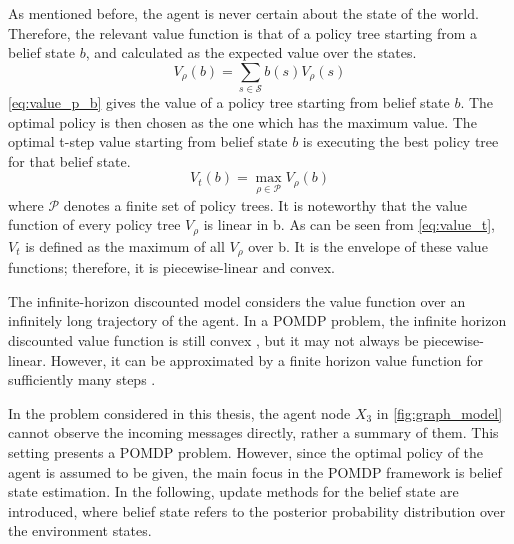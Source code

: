 As mentioned before, the agent is never certain about the state of the world. Therefore, the relevant value function is that of a policy tree starting from a belief state $ b $, and  calculated as the expected value over the states.
\begin{equation}
V_{\rho}(b)=\sum_{s \in \mathcal{S}} b(s) V_{\rho}(s)
\label{eq:value_p_b}
\end{equation}
\autoref{eq:value_p_b} gives the value of a policy tree starting from belief state $ b $. The optimal policy is then chosen as the one which has the maximum value. The optimal t-step value starting from belief state $ b $ is executing the best policy tree for that belief state.
\begin{equation}
V_{t}(b)=\max _{\rho \in \mathcal{P}} V_\rho(b)
\label{eq:value_t}
\end{equation}
where $ \mathcal{P} $ denotes a finite set of policy trees.
It is noteworthy that the value function of every policy tree $ V_\rho $ is linear in b. As can be seen from \autoref{eq:value_t}, $ V_t $ is defined as the maximum of all $ V_\rho $ over b. It is the envelope of these value functions; therefore, it is piecewise-linear and convex.\par
The infinite-horizon discounted model considers the value function over an infinitely long trajectory of the agent. In a POMDP problem, the infinite horizon discounted value function is still convex \cite{White1980}, but it may not always be piecewise-linear. However, it can be approximated by a finite horizon value function for sufficiently many steps \cite{Sawaki1978, Edward2019}.\par
In the problem considered in this thesis, the agent node $ X_{3} $ in \autoref{fig:graph_model} cannot observe the incoming messages directly, rather a summary of them. This setting presents a POMDP problem. However, since the optimal policy of the agent is assumed to be given, the main focus in the POMDP framework is belief state estimation. In the following, update methods for the belief state are introduced, where belief state refers to the posterior probability distribution over the environment states.

